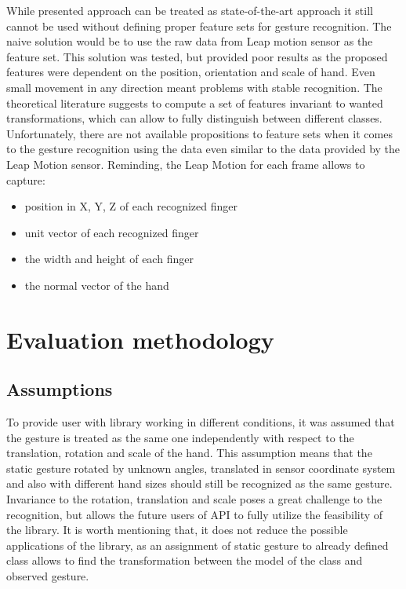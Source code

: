 While presented approach can be treated as state-of-the-art approach it still cannot be used without defining proper feature sets for gesture recognition.
The naive solution would be to use the raw data from Leap motion sensor as the feature set.
This solution was tested, but provided poor results as the proposed features were dependent on the position, orientation and scale of hand. 
Even small movement in any direction meant problems with stable recognition. 
The theoretical literature suggests to compute a set of features invariant to wanted transformations, which can allow to fully distinguish between different classes.
Unfortunately, there are not available propositions to feature sets when it comes to the gesture recognition using the data even similar to the data provided by the Leap Motion sensor.
Reminding, the Leap Motion for each frame allows to capture:

\begin{itemize}
\item position in X, Y, Z of each recognized finger
\item unit vector of each recognized finger
\item the width and height of each finger
\item the normal vector of the hand
\end{itemize}


\section{Evaluation methodology}

\subsection{Assumptions}
To provide user with library working in different conditions, it was assumed that the gesture is treated as the same one independently with respect to the translation, rotation and scale of the hand. 
This assumption means that the static gesture rotated by unknown angles, translated in sensor coordinate system and also with different hand sizes should still be recognized as the same gesture.
Invariance to the rotation, translation and scale poses a great challenge to the recognition, but allows the future users of API to fully utilize the feasibility of the library.
It is worth mentioning that, it does not reduce the possible applications of the library, as an assignment of static gesture to already defined class allows to find the transformation between the model of the class and observed gesture.


